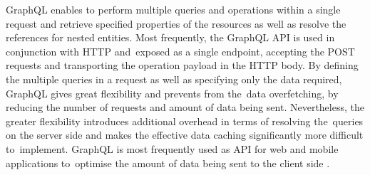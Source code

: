 GraphQL enables to perform multiple queries and operations within a single request and retrieve specified properties of the resources as well as resolve the references for nested entities. Most frequently, the GraphQL API is used in conjunction with HTTP and~exposed as a single endpoint, accepting the POST requests and transporting the operation payload in the HTTP body. By defining the multiple queries in a request as well as specifying only the data required, GraphQL gives great flexibility and prevents from the~data overfetching, by reducing the number of requests and amount of data being sent. Nevertheless, the greater flexibility introduces additional overhead in terms of resolving the~queries on the server side and makes the effective data caching significantly more difficult to~implement. GraphQL is most frequently used as API for web and mobile applications to~optimise the amount of data being sent to the client side \cite{APIDesignInDistributedSystems}.




